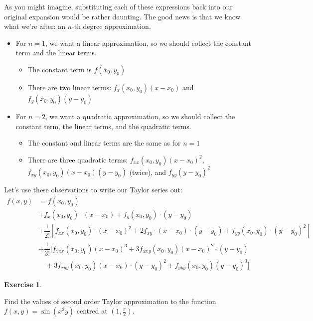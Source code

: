 \documentclass[
]{book}
\providecommand{\tightlist}{%
  \setlength{\itemsep}{0pt}\setlength{\parskip}{0pt}}
\theoremstyle{definition}
\theoremstyle{definition}
\theoremstyle{definition}
\newtheorem{exercise}{Exercise}[chapter]
\theoremstyle{definition}
\theoremstyle{remark}
\begin{document}
As you might imagine, substituting each of these expressions back into our original expansion would be rather daunting. The good news is that we know what we're after: an \(n\)-th degree approximation.

\begin{itemize}
\tightlist
\item
  For \(n=1\), we want a linear approximation, so we should collect the constant term and the linear terms.

  \begin{itemize}
  \tightlist
  \item
    The constant term is \(f(x_0,y_0)\)
  \item
    There are two linear terms: \(f_x(x_0,y_0)(x-x_0)\) and \(f_y(x_0,y_0)(y-y_0)\)
  \end{itemize}
\item
  For \(n=2\), we want a quadratic approximation, so we should collect the constant term, the linear terms, and the quadratic terms.

  \begin{itemize}
  \tightlist
  \item
    The constant and linear terms are the same as for \(n=1\)
  \item
    There are three quadratic terms: \(f_{xx}(x_0,y_0)(x-x_0)^2\), \(f_{xy}(x_0,y_0)(x-x_0)(y-y_0)\) (twice), and \(f_{yy}(y-y_0)^2\)
  \end{itemize}
\end{itemize}

Let's use these observations to write our Taylor series out:
\begin{align*}
f(x,y)&= f(x_0,y_0) \\
&+ f_x(x_0,y_0)\cdot (x-x_0) + f_y(x_0,y_0)\cdot (y-y_0)\\
&+ \dfrac{1}{2!}\left [f_{xx}(x_0,y_0)\cdot(x-x_0)^2 + 2f_{xy}\cdot(x-x_0)\cdot(y-y_0)+f_{yy}(x_0,y_0)\cdot(y-y_0)^2\right ]\\
&+ \dfrac{1}{3!} [f_{xxx}(x_0,y_0)(x-x_0)^3+3f_{xxy}(x_0,y_0)(x-x_0)^2\cdot(y-y_0)\\ & \quad +3f_{xyy}(x_0,y_0)(x-x_0)\cdot (y-y_0)^2+f_{yyy}(x_0,y_0)(y-y_0)^3  ]
\end{align*}

\begin{exercise}
\protect\hypertarget{exr:unlabeled-div-265}{}\label{exr:unlabeled-div-265}

Find the values of second order Taylor approximation to the function \(f(x,y)=\sin(x^2y)\) centred at \(\left(1,\frac{\pi}{2}\right )\).

\end{exercise}
\end{document}
